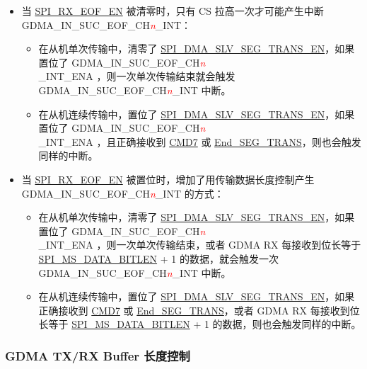 \documentclass[main\_\_CN.tex]{subfiles}
\begin{document}
\begin{itemize}
    \item 当 \hyperref[fielddesc:SPIRXEOFEN]{SPI\_RX\_EOF\_EN} 被清零时，只有 CS 拉高一次才可能产生中断 GDMA\_IN\_SUC\_EOF\_CH\textcolor{red}{\it{n}}\_INT：
        \begin{itemize}
            \item 在从机单次传输中，清零了 \hyperref[fielddesc:SPIDMASLVSEGTRANSEN]{SPI\_DMA\_SLV\_SEG\_TRANS\_EN}，如果置位了 GDMA\_IN\_SUC\_EOF\_CH\textcolor{red}{\it{n}}\\\_INT\_ENA ，则一次单次传输结束就会触发 GDMA\_IN\_SUC\_EOF\_CH\textcolor{red}{\it{n}}\_INT 中断。

            \item 在从机连续传输中，置位了 \hyperref[fielddesc:SPIDMASLVSEGTRANSEN]{SPI\_DMA\_SLV\_SEG\_TRANS\_EN}，如果置位了 GDMA\_IN\_SUC\_EOF\_CH\textcolor{red}{\it{n}}\\\_INT\_ENA ，且正确接收到 \hyperref[other:spi-item-cmd7]{CMD7} 或 \hyperref[other:spi-item-end-seg-trans]{End\_SEG\_TRANS}，则也会触发同样的中断。
        \end{itemize}

    \item 当 \hyperref[fielddesc:SPIRXEOFEN]{SPI\_RX\_EOF\_EN} 被置位时，增加了用传输数据长度控制产生 GDMA\_IN\_SUC\_EOF\_CH\textcolor{red}{\it{n}}\_INT 的方式：
        \begin{itemize}
            \item 在从机单次传输中，清零了 \hyperref[fielddesc:SPIDMASLVSEGTRANSEN]{SPI\_DMA\_SLV\_SEG\_TRANS\_EN}，如果置位了 GDMA\_IN\_SUC\_EOF\_CH\textcolor{red}{\it{n}}\\\_INT\_ENA ，则一次单次传输结束，或者 GDMA RX 每接收到位长等于 \hyperref[fielddesc:SPIMSDATABITLEN]{SPI\_MS\_DATA\_BITLEN} + 1 的数据，就会触发一次 GDMA\_IN\_SUC\_EOF\_CH\textcolor{red}{\it{n}}\_INT 中断。

            \item 在从机连续传输中，置位了 \hyperref[fielddesc:SPIDMASLVSEGTRANSEN]{SPI\_DMA\_SLV\_SEG\_TRANS\_EN}，如果正确接收到 \hyperref[other:spi-item-cmd7]{CMD7} 或 \hyperref[other:spi-item-end-seg-trans]{End\_SEG\_TRANS}，或者 GDMA RX 每接收到位长等于 \hyperref[fielddesc:SPIMSDATABITLEN]{SPI\_MS\_DATA\_BITLEN} + 1 的数据，则也会触发同样的中断。
        \end{itemize}

\end{itemize}


\subsubsection{GDMA TX/RX Buffer 长度控制}\label{sec:spi-dma-tx-rx-buffer-length-ctrl}
\end{document}

